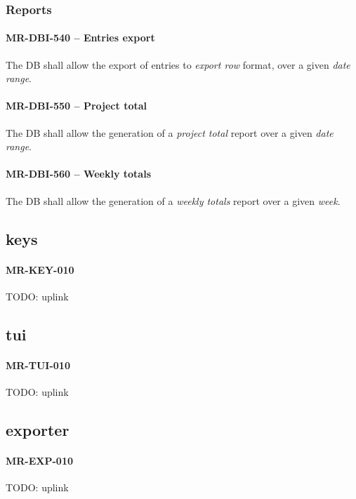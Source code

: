 \subsubsection{Reports}
\paragraph{MR-DBI-540 -- Entries export}
The \gls{DB} shall allow the export of entries to \emph{export row} format,
over a given \emph{date range}.

\paragraph{MR-DBI-550 -- Project total}
The \gls{DB} shall allow the generation of a \emph{project total} report
over a given \emph{date range}.

\paragraph{MR-DBI-560 -- Weekly totals}
The \gls{DB} shall allow the generation of a \emph{weekly totals} report
over a given \emph{week}.

\subsection{keys}
\paragraph{MR-KEY-010}
TODO: uplink

\subsection{tui}
\paragraph{MR-TUI-010}
TODO: uplink

\subsection{exporter}
\paragraph{MR-EXP-010}
TODO: uplink
